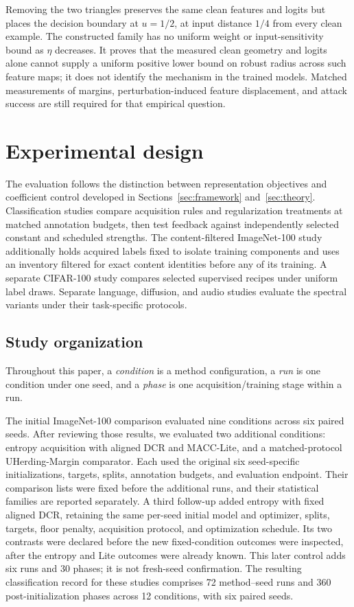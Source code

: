 \documentclass[10pt,a4paper,twocolumn]{article}
\begin{document}
Removing the two triangles preserves the same clean features and logits
but places the decision boundary at $u=1/2$, at input distance $1/4$
from every clean example. The constructed family has no uniform weight
or input-sensitivity bound as $\eta$ decreases. It proves that the
measured clean geometry and logits alone cannot supply a uniform positive
lower bound on robust radius across such feature maps; it does not
identify the mechanism in the trained models.
Matched measurements of margins, perturbation-induced feature
displacement, and attack success are still required for that empirical
question.


\section{Experimental design}\label{sec:experiments}

The evaluation follows the distinction between representation objectives
and coefficient control developed in Sections~\ref{sec:framework}
and~\ref{sec:theory}. Classification studies compare acquisition rules
and regularization treatments at matched annotation budgets, then test
feedback against independently selected constant and scheduled strengths.
The content-filtered ImageNet-100 study additionally holds acquired labels fixed
to isolate training components and uses an inventory filtered for exact
content identities before any of its training. A separate CIFAR-100
study compares selected supervised recipes under uniform label draws.
Separate language, diffusion, and audio studies evaluate the spectral
variants under their task-specific protocols.

\subsection{Study organization}\label{sec:study_sequence}

Throughout this paper, a \emph{condition} is a method configuration, a
\emph{run} is one condition under one seed, and a \emph{phase} is one
acquisition/training stage within a run.

The initial ImageNet-100 comparison evaluated nine conditions across six
paired seeds. After reviewing those results, we evaluated two additional
conditions: entropy acquisition with aligned DCR and MACC-Lite, and a
matched-protocol UHerding-Margin comparator. Each used the original six
seed-specific initializations, targets, splits, annotation budgets, and
evaluation endpoint. Their comparison lists were fixed before the
additional runs, and their statistical families are reported separately.
A third follow-up added entropy with fixed aligned DCR, retaining the
same per-seed initial model and optimizer, splits, targets, floor penalty,
acquisition protocol, and optimization schedule. Its two contrasts were
declared before the new fixed-condition outcomes were inspected, after
the entropy and Lite outcomes were already known. This later control
adds six runs and 30 phases; it is not fresh-seed confirmation.
The resulting classification
record for these studies comprises 72 method--seed runs and 360
post-initialization phases across 12 conditions, with six paired seeds.
\end{document}
